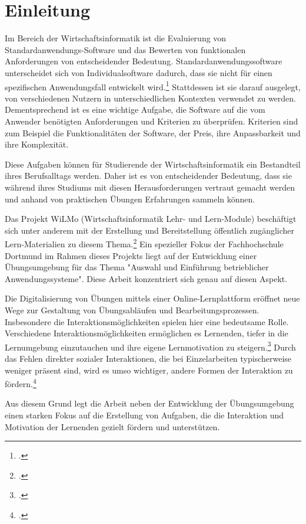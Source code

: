 \chapter{Einleitung}


Im Bereich der Wirtschaftsinformatik ist die Evaluierung von
Standardanwendungs-Software und das Bewerten von funktionalen Anforderungen von entscheidender Bedeutung.
Standardanwendungssoftware unterscheidet sich von Individualsoftware dadurch, dass sie nicht für einen spezifischen Anwendungsfall entwickelt wird.\footcite[Vgl.][S. 3]{Teich2008}{}{} Stattdessen ist sie darauf ausgelegt, von verschiedenen Nutzern in unterschiedlichen Kontexten verwendet zu werden.
Dementsprechend ist es eine wichtige Aufgabe, die Software auf die vom Anwender benötigten Anforderungen und Kriterien zu überprüfen. Kriterien sind zum Beispiel die Funktionalitäten der Software, der Preis, ihre Anpassbarkeit und ihre Komplexität.

Diese Aufgaben können für Studierende der Wirtschaftsinformatik ein Bestandteil ihres Berufsalltags  werden. Daher ist es von entscheidender Bedeutung, dass sie während ihres Studiums mit diesen Herausforderungen vertraut gemacht werden und anhand von praktischen Übungen Erfahrungen sammeln können.

Das Projekt WiLMo (Wirtschaftsinformatik Lehr- und Lern-Module) beschäftigt sich unter anderem mit der Erstellung und Bereitstellung öffentlich zugänglicher Lern-Materialien zu diesem Thema.\footcite[][]{wilmo}{}{}
Ein spezieller Fokus der Fachhochschule Dortmund im Rahmen dieses Projekts liegt auf der Entwicklung einer Übungsumgebung für das Thema "Auswahl und Einführung betrieblicher Anwendungssysteme". Diese Arbeit konzentriert sich genau auf diesen Aspekt.

Die Digitalisierung von Übungen mittels einer Online-Lernplattform eröffnet neue Wege zur Gestaltung von Übungsabläufen und Bearbeitungsprozessen.
Insbesondere die Interaktionsmöglichkeiten spielen hier eine bedeutsame Rolle.
Verschiedene Interaktionsmöglichkeiten ermöglichen es Lernenden, tiefer in die Lernumgebung einzutauchen und ihre eigene Lernmotivation zu steigern.\footcite[Vgl.][S.638]{BolognaDigital}{}{}
Durch das Fehlen direkter sozialer Interaktionen, die bei Einzelarbeiten typischerweise weniger präsent sind, wird es umso wichtiger, andere Formen der Interaktion zu fördern.\footcite[Vgl.][S.638]{BolognaDigital}{}{}

Aus diesem Grund legt die Arbeit neben der Entwicklung der Übungsumgebung einen starken Fokus auf die Erstellung von Aufgaben, die die Interaktion und Motivation der Lernenden gezielt fördern und unterstützen.

